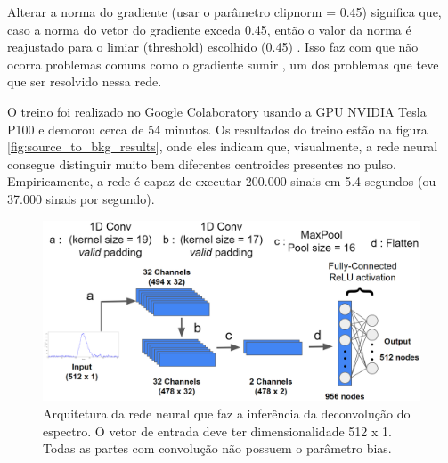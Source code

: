 \documentclass[a4paper,12pt,oneside]{book}
\begin{document}
\par Alterar a norma do gradiente (usar o parâmetro clipnorm = 0.45) significa que, caso a norma do vetor do gradiente exceda 0.45, então o valor da norma é reajustado para o limiar (threshold) escolhido (0.45) \cite{FORTINO2022166497}. Isso faz com que não ocorra problemas comuns como o gradiente sumir \cite{VGP, ADAMAX}, um dos problemas que teve que ser resolvido nessa rede.

\par O treino foi realizado no Google Colaboratory \cite{google_colab} usando a GPU NVIDIA Tesla P100 e demorou cerca de 54 minutos. Os resultados do treino estão na figura \ref{fig:source_to_bkg_results}, onde eles indicam que, visualmente, a rede neural consegue distinguir muito bem diferentes centroides presentes no pulso. Empiricamente, a rede é capaz de executar 200.000 sinais em 5.4 segundos (ou 37.000 sinais por segundo).

\begin{figure}[H]
    \centering
    \includegraphics[scale = 0.28]{figs/source_wobkg_to_deconv.png}
    \caption{Arquitetura da rede neural que faz a inferência da deconvolução do espectro. O vetor de entrada deve ter dimensionalidade 512 x 1. Todas as partes com convolução não possuem o parâmetro bias.}
    \label{fig:source_to_deconv}
\end{figure}
\end{document}
